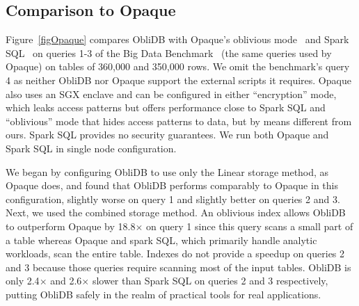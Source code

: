 \documentclass[letterpaper,twocolumn,10pt]{article}
\def\name/{ObliDB}
\begin{document}
\subsection{Comparison to Opaque}

Figure~\ref{figOpaque} compares \name/ with Opaque's oblivious mode~\cite{ZDB+17} and Spark SQL~\cite{SparkSQL} on queries 1-3 of the Big Data Benchmark~\cite{BDB} (the same queries used by Opaque) on tables of 360,000 and 350,000 rows. We omit the benchmark's query 4 as neither \name/ nor Opaque support the external scripts it requires. Opaque also uses an SGX enclave and can be configured in either ``encryption'' mode, which leaks access patterns but offers performance close to Spark SQL and ``oblivious'' mode that hides access patterns to data, but by means different from ours. Spark SQL provides no security guarantees. We run both Opaque and Spark SQL in single node configuration.

We began by configuring \name/ to use only the Linear storage method, as Opaque does, and found that \name/ performs comparably to Opaque in this configuration, slightly worse on query 1 and slightly better on queries 2 and 3. Next, we used the combined storage method. An oblivious index allows \name/ to outperform Opaque by 18.8$\times$ on query 1 since this query scans a small part of a table whereas Opaque and spark SQL, which primarily handle analytic workloads, scan the entire table. Indexes do not provide a speedup on queries 2 and 3 because those queries require scanning most of the input tables. \name/ is only 2.4$\times$ and 2.6$\times$ slower than Spark SQL on queries 2 and 3 respectively, putting \name/ safely in the realm of practical tools for real applications.
\end{document}

